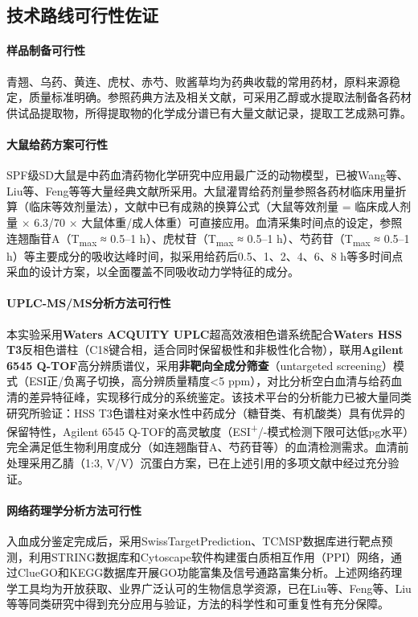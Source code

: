 \documentclass[12pt,a4paper,UTF8,scheme=chinese]{ctexart}
\newcommand{\keyterm}[1]{\textbf{#1}}
\begin{document}
\subsection{技术路线可行性佐证}

\paragraph{样品制备可行性}
青翘、乌药、黄连、虎杖、赤芍、败酱草均为药典收载的常用药材，原料来源稳定，质量标准明确。参照药典方法及相关文献，可采用乙醇或水提取法制备各药材供试品提取物，所得提取物的化学成分谱已有大量文献记录，提取工艺成熟可靠。

\paragraph{大鼠给药方案可行性}
SPF级SD大鼠是中药血清药物化学研究中应用最广泛的动物模型，已被Wang等\cite{Wang2016}、Liu等\cite{Liu2008}、Feng等\cite{FengX2020}等大量经典文献所采用。大鼠灌胃给药剂量参照各药材临床用量折算（临床等效剂量法），文献中已有成熟的换算公式（大鼠等效剂量 = 临床成人剂量 × 6.3/70 × 大鼠体重/成人体重）可直接应用。血清采集时间点的设定，参照连翘酯苷A（T\textsubscript{max} ≈ 0.5--1 h）\cite{Review2021FA}、虎杖苷（T\textsubscript{max} ≈ 0.5--1 h）\cite{Fang2009}、芍药苷（T\textsubscript{max} ≈ 0.5--1 h）\cite{Tong2010}等主要成分的吸收达峰时间，拟采用给药后0.5、1、2、4、6、8 h等多时间点采血的设计方案，以全面覆盖不同吸收动力学特征的成分。

\paragraph{UPLC-MS/MS分析方法可行性}
本实验采用\keyterm{Waters ACQUITY UPLC}超高效液相色谱系统配合\keyterm{Waters HSS T3}反相色谱柱（C18键合相，适合同时保留极性和非极性化合物），联用\keyterm{Agilent 6545 Q-TOF}高分辨质谱仪，采用\textbf{非靶向全成分筛查}（untargeted screening）模式（ESI正/负离子切换，高分辨质量精度<5 ppm），对比分析空白血清与给药血清的差异特征峰，实现移行成分的系统鉴定。该技术平台的分析能力已被大量同类研究所验证：HSS T3色谱柱对亲水性中药成分（糖苷类、有机酸类）具有优异的保留特性，Agilent 6545 Q-TOF的高灵敏度（ESI\textsuperscript{+}/-模式检测下限可达低pg水平）完全满足低生物利用度成分（如连翘酯苷A、芍药苷等）的血清检测需求。血清前处理采用乙腈（1:3, V/V）沉蛋白方案，已在上述引用的多项文献中经过充分验证。

\paragraph{网络药理学分析方法可行性}
入血成分鉴定完成后，采用SwissTargetPrediction、TCMSP数据库进行靶点预测，利用STRING数据库和Cytoscape软件构建蛋白质相互作用（PPI）网络，通过ClueGO和KEGG数据库开展GO功能富集及信号通路富集分析。上述网络药理学工具均为开放获取、业界广泛认可的生物信息学资源，已在Liu等\cite{LiuY2023}、Feng等\cite{Feng2021NP}、Liu等\cite{LiuY2024}等同类研究中得到充分应用与验证，方法的科学性和可重复性有充分保障。
\end{document}
